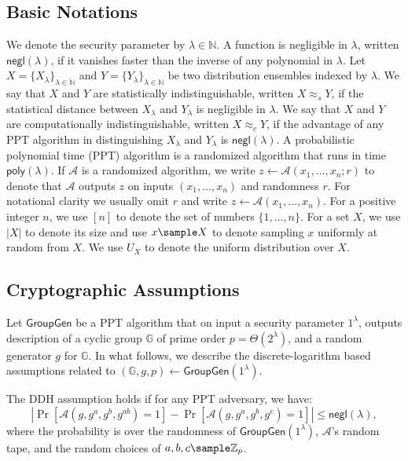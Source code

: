 \documentclass[a4paper,10pt]{article}
\begin{document}
\subsection{Basic Notations}
We denote the security parameter by $\lambda \in \mathbb{N}$. 
A function is negligible in $\lambda$, written $\mathsf{negl}(\lambda)$, 
if it vanishes faster than the inverse of any polynomial in $\lambda$.
Let $X = \{X_\lambda\}_{\lambda \in \mathbb{N}}$ and $Y = \{Y_\lambda\}_{\lambda \in \mathbb{N}}$ 
be two distribution ensembles indexed by $\lambda$. 
We say that $X$ and $Y$ are statistically indistinguishable, written $X \approx_s Y$, 
if the statistical distance between $X_\lambda$ and $Y_\lambda$ is negligible in $\lambda$. 
We say that $X$ and $Y$ are computationally indistinguishable, written $X \approx_c Y$, 
if the advantage of any PPT algorithm in distinguishing $X_\lambda$ and $Y_\lambda$ is $\mathsf{negl}(\lambda)$. 
A probabilistic polynomial time (PPT) algorithm is a randomized algorithm that runs in time $\mathsf{poly}(\lambda)$.
If $\mathcal{A}$ is a randomized algorithm, we write $z \leftarrow \mathcal{A}(x_1, \dots, x_n;r)$
to denote that $\mathcal{A}$ outputs $z$ on inputs $(x_1, \dots, x_n)$ and randomness $r$. 
For notational clarity we usually omit $r$ and write $z \leftarrow \mathcal{A}(x_1, \dots, x_n)$.  
For a positive integer $n$, we use $[n]$ to denote the set of numbers $\{1, \dots, n\}$.
For a set $X$, we use $|X|$ to denote its size 
and use $x \sample X$ to denote sampling $x$ uniformly at random from $X$. 
We use $U_X$ to denote the uniform distribution over $X$. 

\subsection{Cryptographic Assumptions}
Let $\mathsf{GroupGen}$ be a PPT algorithm that on input a security parameter $1^\lambda$, 
outputs description of a cyclic group $\mathbb{G}$ of prime order $p = \Theta(2^\lambda)$, 
and a random generator $g$ for $\mathbb{G}$. 
In what follows, we describe the discrete-logarithm based assumptions related to 
$(\mathbb{G}, g, p) \leftarrow \mathsf{GroupGen}(1^\lambda)$.   

\begin{definition}
The DDH assumption holds if for any PPT adversary, we have: 
\begin{equation*}
\left|\Pr[\mathcal{A}(g, g^a, g^b, g^{ab}) = 1] - 
\Pr[\mathcal{A}(g, g^a, g^b, g^c) = 1] \right| \leq \mathsf{negl}(\lambda),
\end{equation*}
where the probability is over the randomness of $\mathsf{GroupGen}(1^\lambda)$, $\mathcal{A}$'s random tape, 
and the random choices of $a, b, c \sample \mathbb{Z}_p$. 
\end{definition}
\end{document}
